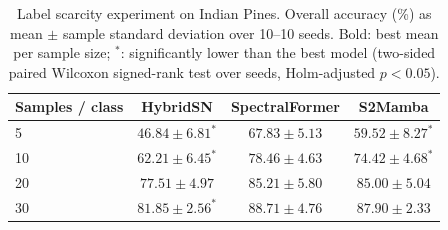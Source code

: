 \begin{table}[!t]
\centering
\caption{Label scarcity experiment on Indian Pines. Overall accuracy (\%) as mean $\pm$ sample standard deviation over 10--10 seeds. Bold: best mean per sample size; $^{*}$: significantly lower than the best model (two-sided paired Wilcoxon signed-rank test over seeds, Holm-adjusted $p<0.05$).}
\label{tab:scarcity_results}
\footnotesize
\setlength{\tabcolsep}{4pt}
\renewcommand{\arraystretch}{1.15}
\begin{tabular}{lccc}
\toprule
\textbf{Samples / class} & \textbf{HybridSN} & \textbf{SpectralFormer} & \textbf{S2Mamba} \\
\midrule
5 & $46.84 \pm 6.81^{*}$ & $\mathbf{67.83 \pm 5.13}$ & $59.52 \pm 8.27^{*}$ \\
10 & $62.21 \pm 6.45^{*}$ & $\mathbf{78.46 \pm 4.63}$ & $74.42 \pm 4.68^{*}$ \\
20 & $77.51 \pm 4.97$ & $\mathbf{85.21 \pm 5.80}$ & $85.00 \pm 5.04$ \\
30 & $81.85 \pm 2.56^{*}$ & $\mathbf{88.71 \pm 4.76}$ & $87.90 \pm 2.33$ \\
\bottomrule
\end{tabular}
\end{table}
